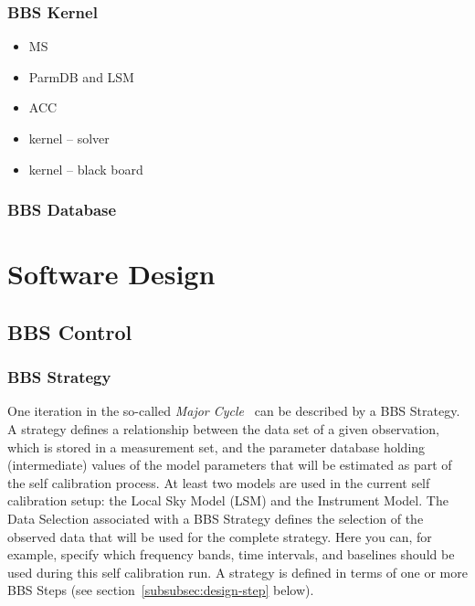 \documentclass[10pt]{lofar}
\begin{document}
\subsubsection{BBS Kernel}
\label{subsubsec:interf-kernel}

\begin{itemize}
\item MS
\item ParmDB and LSM
\item ACC
\item kernel -- solver
\item kernel -- black board
\end{itemize}

\subsubsection{BBS Database}
\label{subsubsec:interf-database}

\cleardoublepage

\section{Software Design}
\label{sec:software-design}

\subsection{BBS Control}
\label{subsec:design-control}

\subsubsection{BBS Strategy}
\label{subsubsec:design-strategy}
One iteration in the so-called \emph{Major
Cycle}~\cite[sec.~4.1]{LOFAR-ASTRON-SDD-050} can be described by a BBS
Strategy. A strategy defines a relationship between the data set of a given
observation, which is stored in a measurement set, and the parameter database
holding (intermediate) values of the model parameters that will be estimated
as part of the self calibration process. At least two models are used in the
current self calibration setup: the Local Sky Model (LSM) and the Instrument
Model. The Data Selection associated with a BBS Strategy defines the selection
of the observed data that will be used for the complete strategy. Here you
can, for example, specify which frequency bands, time intervals, and baselines
should be used during this self calibration run. A strategy is defined in
terms of one or more BBS Steps (see section~\ref{subsubsec:design-step}
below).
\end{document}
